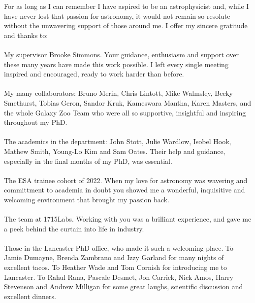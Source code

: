 

\begin{acknowledgements}      %
For as long as I can remember I have aspired to be an astrophysicist and, while I have never lost that passion for astronomy, it would not remain so resolute without the unwavering support of those around me. I offer my sincere gratitude and thanks to:
\\
\\
My supervisor Brooke Simmons. Your guidance, enthusiasm and support over these many years have made this work possible. I left every single meeting inspired and encouraged, ready to work harder than before.
\\
\\
My many collaborators: Bruno Merin, Chris Lintott, Mike Walmsley, Becky Smethurst, Tobias Geron, Sandor Kruk, Kameswara Mantha, Karen Masters, and the whole Galaxy Zoo Team who were all so supportive, insightful and inspiring throughout my PhD. 
\\
\\
The academics in the department: John Stott, Julie Wardlow, Isobel Hook, Mathew Smith, Young-Lo Kim and Sam Oates. Their help and guidance, especially in the final months of my PhD, was essential.
\\
\\
The ESA trainee cohort of 2022. When my love for astronomy was wavering and committment to academia in doubt you showed me a wonderful, inquisitive and welcoming environment that brought my passion back.
\\
\\
The team at 1715Labs. Working with you was a brilliant experience, and gave me a peek behind the curtain into life in industry.
\\
\\
Those in the Lancaster PhD office, who made it such a welcoming place. To Jamie Dumayne, Brenda Zambrano and Izzy Garland for many nights of excellent tacos. To Heather Wade and Tom Cornish for introducing me to Lancaster. To Rahul Rana, Pascale Desmet, Jon Carrick, Nick Amos, Harry Stevenson and Andrew Milligan for some great laughs, scientific discussion and excellent dinners.
\\

\end{acknowledgements}
